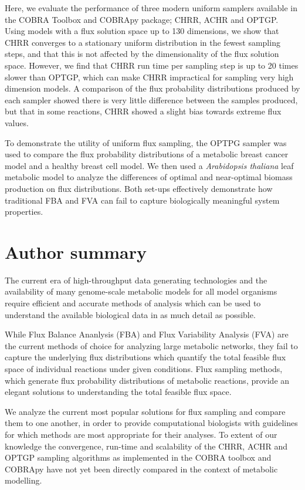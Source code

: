 \documentclass[10pt,letterpaper]{article}
\begin{document}
Here, we evaluate the performance of three modern uniform samplers available in the COBRA Toolbox and COBRApy package; CHRR, ACHR and OPTGP. Using models with a flux solution space up to 130 dimensions, we show that CHRR converges to a stationary uniform distribution in the fewest sampling steps, and that this is not affected by the dimensionality of the flux solution space. However, we find that CHRR run time per sampling step is up to 20 times slower than OPTGP, which can make CHRR impractical for sampling very high dimension models. A comparison of the flux probability distributions produced by each sampler showed there is very little difference between the samples produced, but that in some reactions, CHRR showed a slight bias towards extreme flux values.

To demonstrate the utility of uniform flux sampling, the OPTPG sampler was used to compare the flux probability distributions of a metabolic breast cancer model and a healthy breast cell model. We then used a \textit{Arabidopsis thaliana} leaf metabolic model to analyze the differences of optimal and near-optimal biomass production on flux distributions. Both set-ups effectively demonstrate how traditional FBA and FVA can fail to capture biologically meaningful system properties. 


\section*{Author summary} 
The current era of high-throughput data generating technologies and the availability of many genome-scale metabolic models for all model organisms require efficient and accurate methods of analysis which can be used to understand the available biological data in as much detail as possible. 

While Flux Balance Ananlysis (FBA) and Flux Variability Analysis (FVA) are the current methods of choice for analyzing large metabolic networks, they fail to capture the underlying flux distributions which quantify the total feasible flux space of individual reactions under given conditions. Flux sampling methods, which generate flux probability distributions of metabolic reactions, provide an elegant solutions to understanding the total feasible flux space. 

We analyze the current most popular solutions for flux sampling and compare them to one another, in order to provide computational biologists with guidelines for which methods are most appropriate for their analyses. To extent of our knowledge the convergence, run-time and scalability of the CHRR, ACHR and OPTGP sampling algorithms as implemented in the COBRA toolbox and COBRApy have not yet been directly compared in the context of metabolic modelling. 
\end{document}
